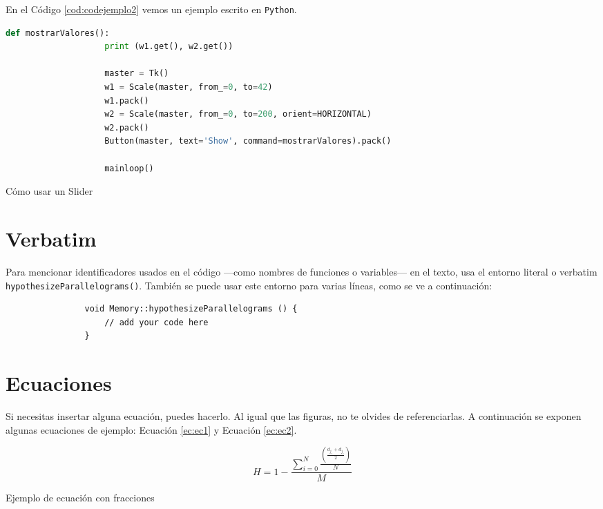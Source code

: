 			En el Código \ref{cod:codejemplo2} vemos un ejemplo escrito en \texttt{Python}.
			
			\begin{code}[h]
				\begin{lstlisting}[language=Python]
					def mostrarValores():
					print (w1.get(), w2.get())
					
					master = Tk()
					w1 = Scale(master, from_=0, to=42)
					w1.pack()
					w2 = Scale(master, from_=0, to=200, orient=HORIZONTAL)
					w2.pack()
					Button(master, text='Show', command=mostrarValores).pack()
					
					mainloop()
				\end{lstlisting}
				\caption[Cómo usar un Slider]{Cómo usar un Slider}
				\label{cod:codejemplo2}
			\end{code}
			
			\section{Verbatim}
			
			Para mencionar identificadores usados en el código ---como nombres de funciones o variables--- en el texto, usa el entorno literal o verbatim \verb|hypothesizeParallelograms()|. También se puede usar este entorno para varias líneas, como se ve a continuación:
			
			\begin{verbatim}
				void Memory::hypothesizeParallelograms () {
					// add your code here
				}
			\end{verbatim}
			
			\section{Ecuaciones}
			
			Si necesitas insertar alguna ecuación, puedes hacerlo. Al igual que las figuras, no te olvides de referenciarlas. A continuación se exponen algunas ecuaciones de ejemplo: Ecuación \ref{ec:ec1} y Ecuación \ref{ec:ec2}.
			
			\begin{myequation}[h]
				\begin{equation}
					H = 1 - \frac{\sum_{i=0}^{N}\frac{(\frac{d_{j_s} + d_{j_e}}{2})}{N}}{M}
					\nonumber
					\label{ec:ec1}
				\end{equation}
				\caption[Ejemplo de ecuación con fracciones]{Ejemplo de ecuación con fracciones}
			\end{myequation} 
			
